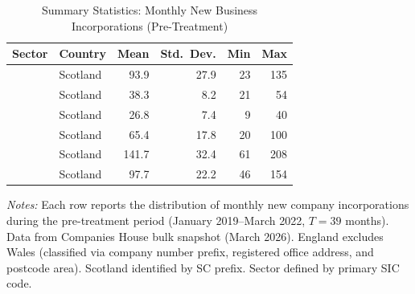 \begin{table}[H]
\centering
\caption{Summary Statistics: Monthly New Business Incorporations (Pre-Treatment)}
\label{tab:summary}
\begin{threeparttable}
\begin{tabular}{llrrrr}
\toprule
Sector & Country & Mean & Std.\ Dev. & Min & Max \\
\midrule
 & Scotland & 93.9 & 27.9 & 23 & 135 \\
\addlinespace
 & Scotland & 38.3 & 8.2 & 21 & 54 \\
\addlinespace
 & Scotland & 26.8 & 7.4 & 9 & 40 \\
\addlinespace
 & Scotland & 65.4 & 17.8 & 20 & 100 \\
\addlinespace
 & Scotland & 141.7 & 32.4 & 61 & 208 \\
\addlinespace
 & Scotland & 97.7 & 22.2 & 46 & 154 \\
\bottomrule
\end{tabular}
\begin{tablenotes}[flushleft]
\small
\item \textit{Notes:} Each row reports the distribution of monthly new company incorporations during the pre-treatment period (January 2019--March 2022, $T = 39$ months). Data from Companies House bulk snapshot (March 2026). England excludes Wales (classified via company number prefix, registered office address, and postcode area). Scotland identified by SC prefix. Sector defined by primary SIC code.
\end{tablenotes}
\end{threeparttable}
\end{table}
